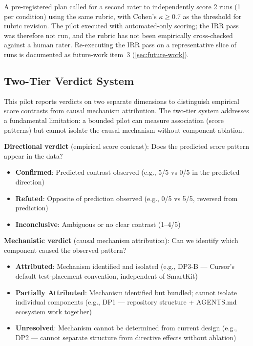 \documentclass[12pt,a4paper]{report}
\begin{document}
A pre-registered plan called for a second rater to independently score 2 runs (1 per condition) using the same rubric, with Cohen's $\kappa \geq 0.7$ as the threshold for rubric revision. The pilot executed with automated-only scoring; the IRR pass was therefore not run, and the rubric has not been empirically cross-checked against a human rater. Re-executing the IRR pass on a representative slice of runs is documented as future-work item~3 (\autoref{sec:future-work}).
\label{sec:pilot-irr}

\subsection{Two-Tier Verdict System}
\label{sec:two-tier-verdict}

This pilot reports verdicts on two separate dimensions to distinguish empirical score contrasts from causal mechanism attribution. The two-tier system addresses a fundamental limitation: a bounded pilot can measure association (score patterns) but cannot isolate the causal mechanism without component ablation.

\textbf{Directional verdict} (empirical score contrast): Does the predicted score pattern appear in the data?
\begin{itemize}
    \item \textbf{Confirmed}: Predicted contrast observed (e.g., 5/5 vs 0/5 in the predicted direction)
    \item \textbf{Refuted}: Opposite of prediction observed (e.g., 0/5 vs 5/5, reversed from prediction)
    \item \textbf{Inconclusive}: Ambiguous or no clear contrast (1--4/5)
\end{itemize}

\textbf{Mechanistic verdict} (causal mechanism attribution): Can we identify which component caused the observed pattern?
\begin{itemize}
    \item \textbf{Attributed}: Mechanism identified and isolated (e.g., DP3-B --- Cursor's default test-placement convention, independent of SmartKit)
    \item \textbf{Partially Attributed}: Mechanism identified but bundled; cannot isolate individual components (e.g., DP1 --- repository structure + AGENTS.md ecosystem work together)
    \item \textbf{Unresolved}: Mechanism cannot be determined from current design (e.g., DP2 --- cannot separate structure from directive effects without ablation)
\end{itemize}
\end{document}
